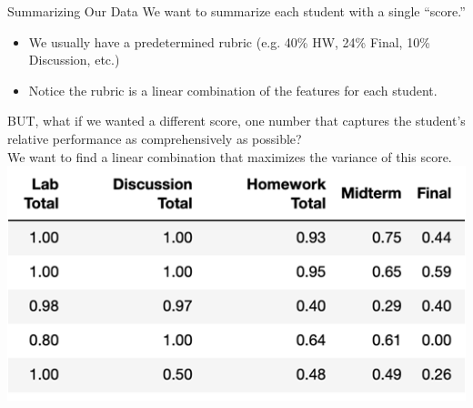 \documentclass[aspectratio=169]{../latex_main/tntbeamer}  %
\begin{document}
	
	\begin{frame}{Summarizing Our Data}
	    We want to summarize each student with a single “score.”
	    \begin{itemize}
	        \item We usually have a predetermined rubric (e.g. 40\% HW, 24\% Final, 10\% Discussion, etc.)
	        \item Notice the rubric is a linear combination of the features for each student.
	    \end{itemize}
	    BUT, what if we wanted a different score, one number that captures the student’s relative performance as comprehensively as possible?\\
	    \bigskip
	    We want to find a linear combination that maximizes the variance of this score.\\
	    \hfill \includegraphics[scale=.6]{Bild6}
	\end{frame}
	
\end{document}
